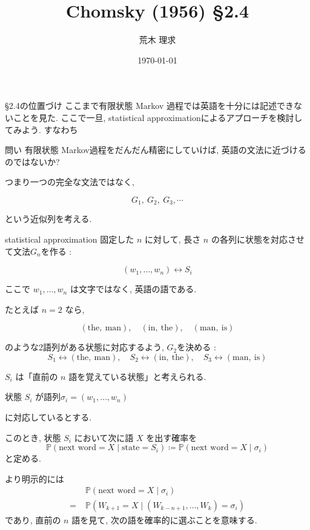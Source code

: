 \documentclass[dvipdfmx, xcolor={dvipsnames},12pt]{beamer}
\title{Chomsky (1956) \S2.4}
\author{荒木 理求}
\date\today
\begin{document}
\begin{frame}
  \titlepage
\end{frame}

\begin{frame}{\S2.4の位置づけ}
ここまで有限状態 Markov 過程では英語を十分には記述できないことを見た. ここで一旦, statistical approximationによるアプローチを検討してみよう. すなわち

\begin{block}{問い}
有限状態 Markov過程をだんだん精密にしていけば, 英語の文法に近づけるのではないか?
\end{block}

つまり一つの完全な文法ではなく,

\[
G_1,\ G_2,\ G_3,\cdots
\]

という近似列を考える.
\end{frame}

\begin{frame}{statistical approximation}
固定した \(n\) に対して, 長さ \(n\) の各列に状態を対応させて文法$G_n$を作る : 

\[
(w_1,\dots,w_n) \longleftrightarrow S_i
\]

ここで \(w_1,\dots,w_n\) は文字ではなく, 英語の語である.

たとえば \(n=2\) なら,

\[
(\text{the},\ \text{man}),\quad
(\text{in},\ \text{the}),\quad
(\text{man},\ \text{is})
\]

のような2語列がある状態に対応するよう, $G_2$を決める :
\[
S_1 \leftrightarrow (\text{the},\ \text{man}),\quad
S_2 \leftrightarrow (\text{in},\ \text{the}),\quad
S_3 \leftrightarrow (\text{man},\ \text{is})
\]
\begin{marker}
\(S_i\) は「直前の \(n\) 語を覚えている状態」と考えられる.
\end{marker}
\end{frame}

\begin{frame}
状態 \(S_i\) が語列$\sigma_i=(w_1,\dots,w_n)$

に対応しているとする.

このとき, 状態 \(S_i\) において次に語 \(X\) を出す確率を
\[
\mathbb{P}(\text{next word}=X \mid \text{state}=S_i)
\coloneq
\mathbb{P}(\text{next word}=X \mid \sigma_i)
\]
と定める.
\begin{marker}
より明示的には
\begin{align*}
&\mathbb{P}(\text{next word}=X \mid \sigma_i)\\
=\;&
\mathbb{P}
\left(
W_{k+1}=X
\mid
(W_{k-n+1},\dots,W_k)=\sigma_i
\right)
\end{align*}
であり, 直前の \(n\) 語を見て, 次の語を確率的に選ぶことを意味する.
\end{marker}
\end{frame}
\end{document}
